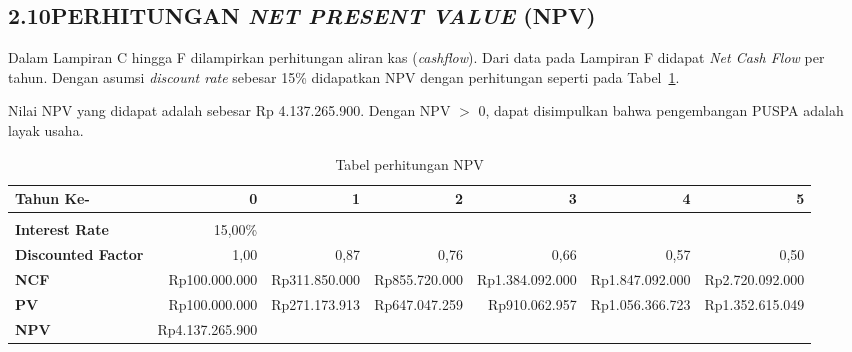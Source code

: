 \subsection*{\textsf{\normalsize 2.10\hspace{0.5cm}PERHITUNGAN \textit{NET PRESENT VALUE} (NPV)}}

Dalam Lampiran C hingga F dilampirkan perhitungan aliran kas (\textit{cashflow}). Dari data pada Lampiran F didapat \textit{Net Cash Flow} per tahun. Dengan asumsi \textit{discount rate} sebesar 15\% didapatkan NPV dengan perhitungan seperti pada Tabel~\ref{tab:npv}.

Nilai NPV yang didapat adalah sebesar Rp 4.137.265.900. Dengan NPV $>$ 0, dapat disimpulkan bahwa pengembangan PUSPA adalah layak usaha.

\begin{table}
	\centering
		\begin{tabular}{|>{\scriptsize}p{1.4cm}|>{\scriptsize}r|>{\scriptsize}r|>{\scriptsize}r|>{\scriptsize}r|>{\scriptsize}r|>{\scriptsize}r|}
\hline
\textbf{Tahun Ke-} & \textbf{0} & \textbf{1} & \textbf{2} & \textbf{3} & \textbf{4} & \textbf{5}\\
\hline
\multicolumn{7}{c}{}\\
\hline
\textbf{Interest Rate} & 15,00\% & \multicolumn{5}{c|}{}\\
\hline
\textbf{Discounted Factor} & 1,00 & 0,87 & 0,76 & 0,66 & 0,57 & 0,50\\
\hline
\textbf{NCF} & Rp100.000.000 & Rp311.850.000 & Rp855.720.000 & Rp1.384.092.000 & Rp1.847.092.000 & Rp2.720.092.000\\
\hline
\textbf{PV} & Rp100.000.000 & Rp271.173.913 & Rp647.047.259 & Rp910.062.957 & Rp1.056.366.723 & Rp1.352.615.049\\
\hline
\textbf{NPV} & Rp4.137.265.900 & \multicolumn{5}{c|}{}\\
\hline
\end{tabular}

	\caption{Tabel perhitungan NPV}
	\label{tab:npv}
\end{table}

